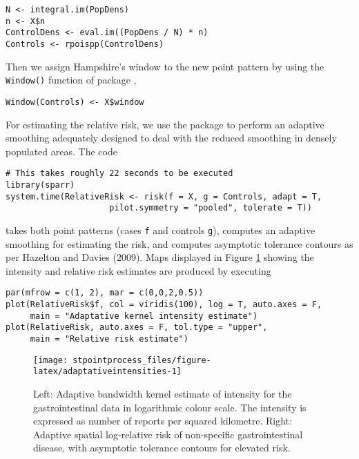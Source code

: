 \begin{verbatim}
N <- integral.im(PopDens) 
n <- X$n
ControlDens <- eval.im((PopDens / N) * n)
Controls <- rpoispp(ControlDens)
\end{verbatim}

Then we assign Hampshire's window to the new point pattern by using the \texttt{Window()} function of package ,

\begin{verbatim}
Window(Controls) <- X$window
\end{verbatim}

For estimating the relative risk, we use the  package to perform an adaptive smoothing adequately designed to deal with the reduced smoothing in densely populated areas. The code

\begin{verbatim}
# This takes roughly 22 seconds to be executed 
library(sparr)
system.time(RelativeRisk <- risk(f = X, g = Controls, adapt = T, 
                     pilot.symmetry = "pooled", tolerate = T))
\end{verbatim}

takes both point patterns (cases \texttt{f} and controls \texttt{g}), computes an adaptive smoothing for estimating the risk, and computes asymptotic tolerance contours as per Hazelton and Davies (2009). Maps displayed in Figure \ref{fig:adaptativeintensities} showing the intensity and relative risk estimates are produced by executing

\begin{verbatim}
par(mfrow = c(1, 2), mar = c(0,0,2,0.5)) 
plot(RelativeRisk$f, col = viridis(100), log = T, auto.axes = F, 
     main = "Adaptative kernel intensity estimate")
plot(RelativeRisk, auto.axes = F, tol.type = "upper", 
     main = "Relative risk estimate")
\end{verbatim}

\begin{figure}

{\centering \texttt{[image: stpointprocess\_files/figure-latex/adaptativeintensities-1]} 

}

\caption{Left: Adaptive bandwidth kernel estimate of intensity for the gastrointestinal data in logarithmic colour scale. The intensity is expressed as number of reports per squared kilometre. Right: Adaptive spatial log-relative risk of non-specific gastrointestinal disease, with asymptotic tolerance contours for elevated risk.}\label{fig:adaptativeintensities}
\end{figure}

